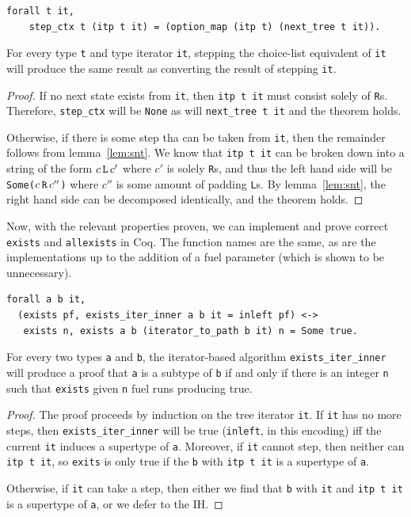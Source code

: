 \documentclass[a4paper,english]{lipics-v2019}
\renewcommand{\L}{{\tt L}\xspace}
\newcommand{\Ls}{{\tt L}s\xspace}
\newcommand{\R}{{\tt R}\xspace}
\newcommand{\Rs}{{\tt R}s\xspace}
\begin{document}
\begin{lemma}
\begin{small}\begin{verbatim}
forall t it,
    step_ctx t (itp t it) = (option_map (itp t) (next_tree t it)).
\end{verbatim}\end{small}
For every type \verb|t| and type iterator \verb|it|,
stepping the choice-list equivalent of \verb|it| will
produce the same result as converting the result of stepping
\verb|it|.
\end{lemma}
\begin{proof}
If no next state exists from \verb|it|, then
\verb|itp t it| must consist solely of \Rs. Therefore, \verb|step_ctx| will be \verb|None| as 
will \verb|next_tree t it| and the theorem holds. 

Otherwise, if there is some step tha can be taken from \verb|it|, then 
the remainder follows from lemma~\ref{lem:snt}. We know that \verb|itp t it| can
be broken down into a string of the form $c\,\L\,c'$ where $c'$ is solely \Rs, and thus
the left hand side will be \verb|Some(|$c\,\R\,c''$\verb|)| where $c''$ is some amount of 
padding \Ls. By lemma~\ref{lem:snt}, the right hand side can be decomposed identically, and the theorem holds.
\end{proof}

Now, with the relevant properties proven, we can implement and prove correct
\verb|exists| and \verb|allexists| in Coq. The function names are the
same, as are the implementations up to the addition of a fuel parameter (which
is shown to be unnecessary). 

\begin{lemma}
\label{lem:correxcst}
\begin{small}\begin{verbatim}
forall a b it, 
  (exists pf, exists_iter_inner a b it = inleft pf) <->
   exists n, exists a b (iterator_to_path b it) n = Some true.
\end{verbatim}\end{small}
For every two types \verb|a| and \verb|b|, the iterator-based algorithm
\verb|exists_iter_inner| will produce a proof that \verb|a| is a subtype
of \verb|b| if and only if there is an integer \verb|n| such that
 \verb|exists| given \verb|n| fuel runs producing true.
\end{lemma}
\begin{proof}

The proof proceeds by induction on the tree iterator \verb|it|. If
\verb|it| has no more steps, then \verb|exists_iter_inner| will be true
(\verb|inleft|, in this encoding) iff the current \verb|it| induces a
supertype of \verb|a|. Moreover, if \verb|it| cannot step, then neither can
\verb|itp t it|, so \verb|exits| is only true if the \verb|b| with \verb|itp t it|
is a supertype of \verb|a|. 

Otherwise, if \verb|it| can take a step, then either we find that \verb|b|
with \verb|it| and \verb|itp t it| is a supertype of \verb|a|, or we defer to
the IH.
\end{proof}
\end{document}
